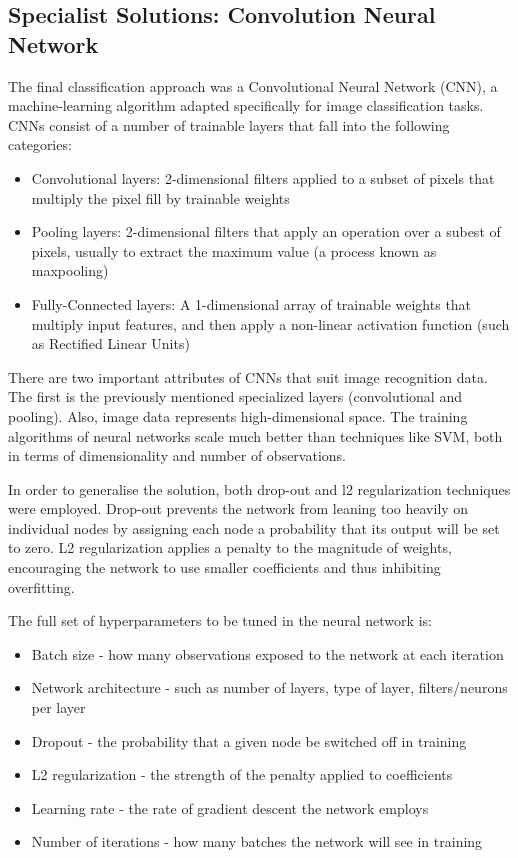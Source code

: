 \documentclass[11pt]{article}
\begin{document}
\subsection{Specialist Solutions: Convolution Neural Network}
The final classification approach was a Convolutional Neural Network (CNN), a machine-learning algorithm adapted specifically for image classification tasks. CNNs consist of a number of trainable layers that fall into the following categories:
\begin{itemize}
  \item Convolutional layers: 2-dimensional filters applied to a subset of pixels that multiply the pixel fill by trainable weights
  \item Pooling layers: 2-dimensional filters that apply an operation over a subest of pixels, usually to extract the maximum value (a process known as maxpooling)
  \item Fully-Connected layers: A 1-dimensional array of trainable weights that multiply input features, and then apply a non-linear activation function (such as Rectified Linear Units)
\end{itemize}

There are two important attributes of CNNs that suit image recognition data. The first is the previously mentioned specialized layers (convolutional and pooling). Also, image data represents high-dimensional space. The training algorithms of neural networks scale much better than techniques like SVM, both in terms of dimensionality and number of observations.

In order to generalise the solution, both drop-out and l2 regularization techniques were employed. Drop-out prevents the network from leaning too heavily on individual nodes by assigning each node a probability that its output will be set to zero. L2 regularization applies a penalty to the magnitude of weights, encouraging the network to use smaller coefficients and thus inhibiting overfitting.

The full set of hyperparameters to be tuned in the neural network is:
\begin{itemize}
\item Batch size - how many observations exposed to the network at each iteration
\item Network architecture - such as  number of layers, type of layer, filters/neurons per layer
\item Dropout - the probability that a given node be switched off in training
\item L2 regularization - the strength of the penalty applied to coefficients
\item Learning rate - the rate of gradient descent the network employs
\item Number of iterations - how many batches the network will see in training
\end{itemize}
\end{document}
